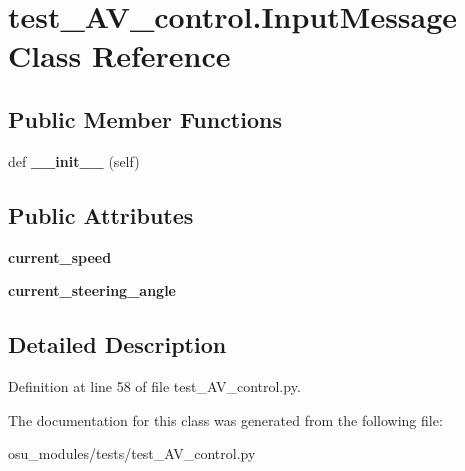 \hypertarget{classtest__AV__control_1_1InputMessage}{}\section{test\+\_\+\+A\+V\+\_\+control.\+Input\+Message Class Reference}
\label{classtest__AV__control_1_1InputMessage}
\subsection*{Public Member Functions}
\begin{DoxyCompactItemize}
\item 
\mbox{\label{classtest__AV__control_1_1InputMessage_af9e842f7bf2a382a6dec836d7cf7adaf}} 
def {\bfseries \+\_\+\+\_\+init\+\_\+\+\_\+} (self)
\end{DoxyCompactItemize}
\subsection*{Public Attributes}
\begin{DoxyCompactItemize}
\item 
\mbox{\label{classtest__AV__control_1_1InputMessage_ae2b571206b6ccaeb1c1d5701de1225c7}} 
{\bfseries current\+\_\+speed}
\item 
\mbox{\label{classtest__AV__control_1_1InputMessage_acd27f0020caa5ccff0aeead6ea9e5b15}} 
{\bfseries current\+\_\+steering\+\_\+angle}
\end{DoxyCompactItemize}


\subsection{Detailed Description}


Definition at line 58 of file test\+\_\+\+A\+V\+\_\+control.\+py.



The documentation for this class was generated from the following file\+:\begin{DoxyCompactItemize}
\item 
osu\+\_\+modules/tests/test\+\_\+\+A\+V\+\_\+control.\+py\end{DoxyCompactItemize}
